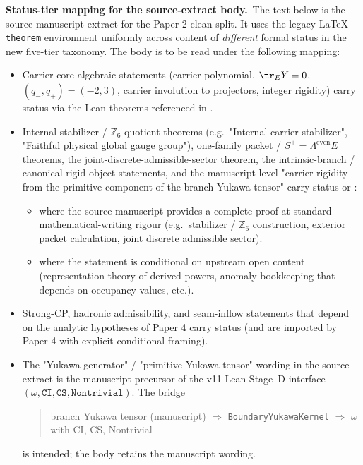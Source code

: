 \begin{tfptwarningbox}
\textbf{Status-tier mapping for the source-extract body.}\
The text below is the source-manuscript extract for the Paper-2
clean split. It uses the legacy \LaTeX{} \texttt{theorem}
environment uniformly across content of \emph{different} formal
status in the new five-tier taxonomy. The body is to be read
under the following mapping:

\smallskip
\begin{itemize}[leftmargin=1.7em, itemsep=0pt]
    \item Carrier-core algebraic statements
        (carrier polynomial, $\tr_E Y = 0$, $(q_-,q_+)=(-2,3)$,
        carrier involution to projectors, integer rigidity)
        carry status  via the Lean theorems referenced
        in .
    \item Internal-stabilizer / $\mathbb Z_6$ quotient theorems
        (e.g.\ "Internal carrier stabilizer",
        "Faithful physical global gauge group"),
        one-family packet / $S^+ = \Lambda^{\mathrm{even}} E$
        theorems, the joint-discrete-admissible-sector theorem,
        the intrinsic-branch / canonical-rigid-object
        statements, and the manuscript-level "carrier rigidity
        from the primitive component of the branch Yukawa
        tensor" carry status  or :
        \begin{itemize}[leftmargin=1.2em, itemsep=0pt]
            \item \stag{M} where the source manuscript provides
                a complete proof at standard mathematical-writing
                rigour (e.g.\ stabilizer / $\mathbb Z_6$
                construction, exterior packet calculation, joint
                discrete admissible sector).
            \item {} where the statement is conditional on
                upstream open content (representation theory of
                derived powers, anomaly bookkeeping that depends
                on \stag{C} occupancy values, etc.).
        \end{itemize}
    \item Strong-CP, hadronic admissibility, and seam-inflow
        statements that depend on the analytic hypotheses of
        Paper 4 carry status  (and are imported by
        Paper 4 with explicit conditional framing).
    \item The "Yukawa generator" / "primitive Yukawa tensor"
        wording in the source extract is the manuscript
        precursor of the v11 Lean Stage~D interface
        $(\omega, \texttt{CI}, \texttt{CS}, \texttt{Nontrivial})$.
        The bridge
        \begin{quote}\small
        branch Yukawa tensor (manuscript)
        \;$\Rightarrow$\;
        \texttt{BoundaryYukawaKernel}
        \;$\Rightarrow$\;
        $\omega$ with CI, CS, Nontrivial 
        \end{quote}
        is intended; the body retains the manuscript wording.
\end{itemize}


\end{tfptwarningbox}
